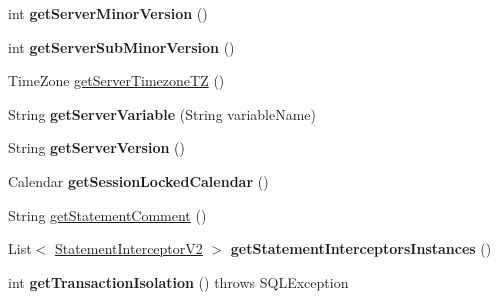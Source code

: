 \begin{DoxyCompactItemize}
int {\bfseries get\+Server\+Minor\+Version} ()
\item 
\mbox{\label{classcom_1_1mysql_1_1jdbc_1_1_multi_host_my_s_q_l_connection_afc3b1d46fa6d5e0d82215955450dfe00}} 
int {\bfseries get\+Server\+Sub\+Minor\+Version} ()
\item 
Time\+Zone \mbox{\hyperlink{classcom_1_1mysql_1_1jdbc_1_1_multi_host_my_s_q_l_connection_a6cd4e5250d8940bbbfeb6d5a4a4efb45}{get\+Server\+Timezone\+TZ}} ()
\item 
\mbox{\label{classcom_1_1mysql_1_1jdbc_1_1_multi_host_my_s_q_l_connection_a6f37c39e99eef84d28a2e55c7c68f792}} 
String {\bfseries get\+Server\+Variable} (String variable\+Name)
\item 
\mbox{\label{classcom_1_1mysql_1_1jdbc_1_1_multi_host_my_s_q_l_connection_a6fe6c7fa3d978b43b18e2eadc41c6ab7}} 
String {\bfseries get\+Server\+Version} ()
\item 
\mbox{\label{classcom_1_1mysql_1_1jdbc_1_1_multi_host_my_s_q_l_connection_ae996ab77e3cf58874b995766627d314a}} 
Calendar {\bfseries get\+Session\+Locked\+Calendar} ()
\item 
String \mbox{\hyperlink{classcom_1_1mysql_1_1jdbc_1_1_multi_host_my_s_q_l_connection_a9d4bbb42860206a659b53b3d5441fac3}{get\+Statement\+Comment}} ()
\item 
\mbox{\label{classcom_1_1mysql_1_1jdbc_1_1_multi_host_my_s_q_l_connection_a4d074b206dc45d7f5cc4975a847f560b}} 
List$<$ \mbox{\hyperlink{interfacecom_1_1mysql_1_1jdbc_1_1_statement_interceptor_v2}{Statement\+Interceptor\+V2}} $>$ {\bfseries get\+Statement\+Interceptors\+Instances} ()
\item 
\mbox{\label{classcom_1_1mysql_1_1jdbc_1_1_multi_host_my_s_q_l_connection_a02de9f36af41b4e3cd1af98fc80d240d}} 
int {\bfseries get\+Transaction\+Isolation} ()  throws S\+Q\+L\+Exception 
\item 
\mbox{\label{classcom_1_1mysql_1_1jdbc_1_1_multi_host_my_s_q_l_connection_a7e5b3a5bbbc1afd5e5ad940612d35bde}} 

\end{DoxyCompactItemize}
